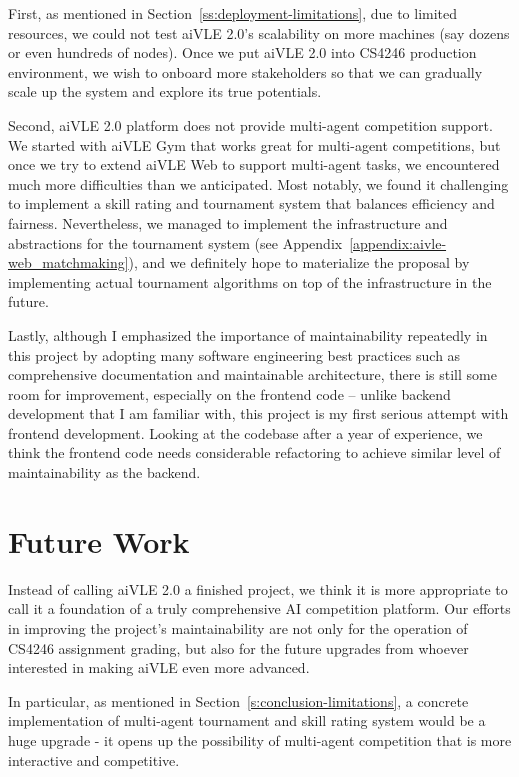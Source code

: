 First, as mentioned in Section~\ref{ss:deployment-limitations}, due to limited resources, we could not test aiVLE 2.0's scalability on more machines (say dozens or even hundreds of nodes). Once we put aiVLE 2.0 into CS4246 production environment, we wish to onboard more stakeholders so that we can gradually scale up the system and explore its true potentials.

Second, aiVLE 2.0 platform does not provide multi-agent competition support. We started with aiVLE Gym that works great for multi-agent competitions, but once we try to extend aiVLE Web to support multi-agent tasks, we encountered much more difficulties than we anticipated. Most notably, we found it challenging to implement a skill rating and tournament system that balances efficiency and fairness. Nevertheless, we managed to implement the infrastructure and abstractions for the tournament system (see Appendix~\ref{appendix:aivle-web_matchmaking}), and we definitely hope to materialize the proposal by implementing actual tournament algorithms on top of the infrastructure in the future.

Lastly, although I emphasized the importance of maintainability repeatedly in this project by adopting many software engineering best practices such as comprehensive documentation and maintainable architecture, there is still some room for improvement, especially on the frontend code – unlike backend development that I am familiar with, this project is my first serious attempt with frontend development. Looking at the codebase after a year of experience, we think the frontend code needs considerable refactoring to achieve similar level of maintainability as the backend.

\section{Future Work}
\label{s:conclusion-future_work}
Instead of calling aiVLE 2.0 a finished project, we think it is more appropriate to call it a foundation of a truly comprehensive AI competition platform. Our efforts in improving the project's maintainability are not only for the operation of CS4246 assignment grading, but also for the future upgrades from whoever interested in making aiVLE even more advanced.

In particular, as mentioned in Section~\ref{s:conclusion-limitations}, a concrete implementation of multi-agent tournament and skill rating system would be a huge upgrade - it opens up the possibility of multi-agent competition that is more interactive and competitive.

